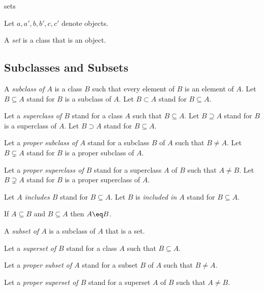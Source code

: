 \documentclass{article}
\begin{document}
\begin{smodule}{sets}
\begin{forthel}
  Let $a,a',b,b',c,c'$ denote objects.
\end{forthel}

\begin{definition*}
  A \emph{set} is a class that is an object.
\end{definition*}


\subsection{Subclasses and Subsets}

\begin{definition*}[forthel,id=SubclassDef,printid]
  A \emph{subclass of $A$} is a class $B$ such that every element of $B$ is an element of $A$.
  Let $B\subseteq A$ stand for $B$ is a subclass of $A$.
  Let $B\subset A$ stand for $B\subseteq A$.

  Let a \emph{superclass of $B$} stand for a class $A$ such that $B\subseteq A$.
  Let $B\supseteq A$ stand for $B$ is a superclass of $A$.
  Let $B\supset A$ stand for $B\subseteq A$.

  Let a \emph{proper subclass of $A$} stand for a subclass $B$ of $A$ such that $B\neq A$.
  Let $B\subsetneq A$ stand for $B$ is a proper subclass of $A$.

  Let a \emph{proper superclass of $B$} stand for a superclass $A$ of $B$ such that $A \neq B$.
  Let $B\supsetneq A$ stand for $B$ is a proper superclass of $A$.

  Let \emph{$A$ includes $B$} stand for $B\subseteq A$.
  Let $B$ is \emph{included in $A$} stand for $B\subseteq A$.
\end{definition*}

\begin{axiom*}[forthel,title=Class Extensionality Axiom,id=ClassExtensionalityAx,printid]
  If $A\subseteq B$ and $B\subseteq A$ then $A\eq B$.
\end{axiom*}

\begin{definition*}[forthel,id=SubsetDef,printid]
  A \emph{subset of $A$} is a subclass of $A$ that is a set.

  Let a \emph{superset of $B$} stand for a class $A$ such that $B\subseteq A$.

  Let a \emph{proper subset of $A$} stand for a subset $B$ of $A$ such that $B\neq A$.

  Let a \emph{proper superset of $B$} stand for a superset $A$ of $B$ such that $A \neq B$.
\end{definition*}


\end{smodule}
\end{document}
